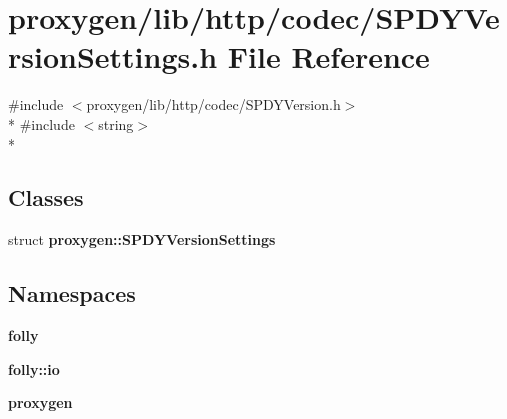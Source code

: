 \section{proxygen/lib/http/codec/\+S\+P\+D\+Y\+Version\+Settings.h File Reference}
\label{SPDYVersionSettings_8h}
{\ttfamily \#include $<$proxygen/lib/http/codec/\+S\+P\+D\+Y\+Version.\+h$>$}\\*
{\ttfamily \#include $<$string$>$}\\*
\subsection*{Classes}
\begin{DoxyCompactItemize}
\item 
struct {\bf proxygen\+::\+S\+P\+D\+Y\+Version\+Settings}
\end{DoxyCompactItemize}
\subsection*{Namespaces}
\begin{DoxyCompactItemize}
\item 
 {\bf folly}
\item 
 {\bf folly\+::io}
\item 
 {\bf proxygen}
\end{DoxyCompactItemize}
